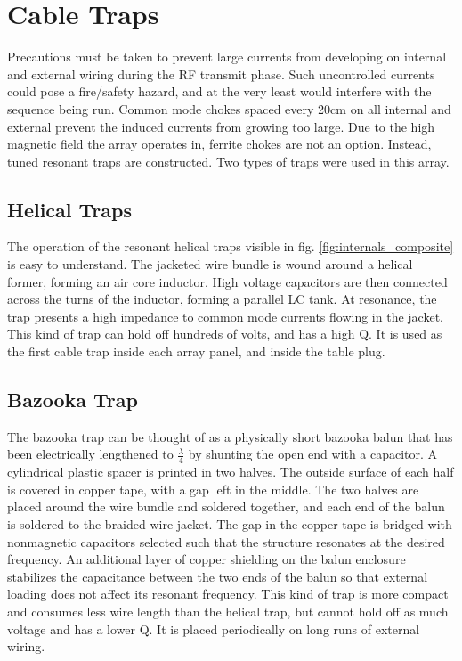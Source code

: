 \section{Cable Traps}
Precautions must be taken to prevent large currents from developing on internal and external wiring during the RF
transmit phase. Such uncontrolled currents could pose a fire/safety hazard, and at the very least would interfere with
the sequence being run. Common mode chokes spaced every 20cm on all internal and external prevent the induced currents
from growing too large. Due to the high magnetic field the array operates in, ferrite chokes are not an option. Instead,
tuned resonant traps are constructed. Two types of traps were used in this array.

\subsection{Helical Traps}
The operation of the resonant helical traps visible in fig. \ref{fig:internals_composite} is easy to understand.  The
jacketed wire bundle is wound around a helical former, forming an air core inductor. High voltage capacitors are then
connected across the turns of the inductor, forming a parallel LC tank. At resonance, the trap presents a high impedance
to common mode currents flowing in the jacket.  This kind of trap can hold off hundreds of volts, and has a high Q. It
is used as the first cable trap inside each array panel, and inside the table plug.

\subsection{Bazooka Trap}

The bazooka trap can be thought of as a physically short bazooka balun that has been electrically lengthened to
$\frac{\lambda}{4}$ by shunting the open end with a capacitor. A cylindrical plastic spacer is printed in two halves.
The outside surface of each half is covered in copper tape, with a gap left in the middle. The two halves are placed
around the wire bundle and soldered together, and each end of the balun is soldered to the braided wire jacket. The gap
in the copper tape is bridged with nonmagnetic capacitors selected such that the structure resonates at the desired
frequency. An additional layer of copper shielding on the balun enclosure stabilizes the capacitance between the two
ends of the balun so that external loading does not affect its resonant frequency.  This kind of trap is more compact
and consumes less wire length than the helical trap, but cannot hold off as much voltage and has a lower Q. It is
placed periodically on long runs of external wiring.

